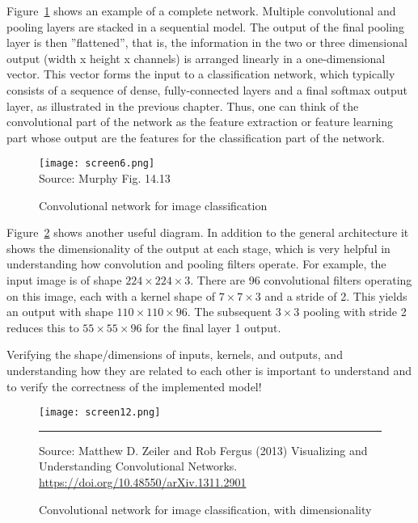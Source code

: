 Figure~\ref{fig:screen6} shows an example of a complete network. Multiple convolutional and pooling layers are stacked in a sequential model. The output of the final pooling layer is then ''flattened'', that is, the information in the two or three dimensional output (width x height x channels) is arranged linearly in a one-dimensional vector. This vector forms the input to a classification network, which typically consists of a sequence of dense, fully-connected layers and a final softmax output layer, as illustrated in the previous chapter. Thus, one can think of the convolutional part of the network as the feature extraction or feature learning part whose output are the features for the classification part of the network.

\begin{figure}
\centering
\texttt{[image: screen6.png]} \\

\scriptsize Source: Murphy Fig. 14.13
\caption{Convolutional network for image classification}
\label{fig:screen6}
\end{figure}

Figure~\ref{fig:screen12} shows another useful diagram. In addition to the general architecture it shows the dimensionality of the output at each stage, which is very helpful in understanding how convolution and pooling filters operate. For example, the input image is of shape $224 \times 224 \times 3$. There are 96 convolutional filters operating on this image, each with a kernel shape of $7 \times 7 \times 3$ and a stride of 2. This yields an output with shape $110 \times 110 \times 96$. The subsequent $3 \times 3$ pooling with stride 2 reduces this to $55 \times 55 \times 96$ for the final layer 1 output. 

\begin{tcolorbox}[colback=alert]
Verifying the shape/dimensions of inputs, kernels, and outputs, and understanding how they are related to each other is important to understand and to verify the correctness of the implemented model!
\end{tcolorbox}

\begin{figure}
\centering
\texttt{[image: screen12.png]}  \\
\vspace{\baselineskip}

\hrule

\vspace{\baselineskip}
\scriptsize Source: Matthew D. Zeiler and Rob Fergus (2013) Visualizing and Understanding Convolutional Networks. \url{https://doi.org/10.48550/arXiv.1311.2901}

\caption{Convolutional network for image classification, with dimensionality}
\label{fig:screen12}
\end{figure}


